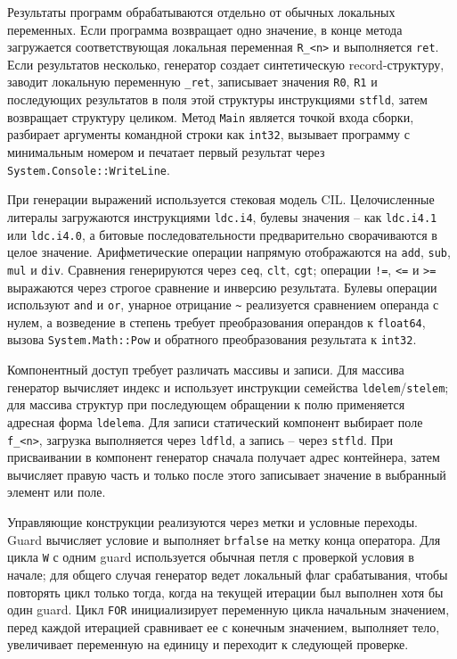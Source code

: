 Результаты программ обрабатываются отдельно от обычных локальных переменных.
Если программа возвращает одно значение, в конце метода загружается соответствующая локальная переменная \texttt{R\_<n>} и выполняется \texttt{ret}.
Если результатов несколько, генератор создает синтетическую record-структуру, заводит локальную переменную \texttt{\_ret}, записывает значения \texttt{R0}, \texttt{R1} и последующих результатов в поля этой структуры инструкциями \texttt{stfld}, затем возвращает структуру целиком.
Метод \texttt{Main} является точкой входа сборки, разбирает аргументы командной строки как \texttt{int32}, вызывает программу с минимальным номером и печатает первый результат через \texttt{System.Console::WriteLine}.

При генерации выражений используется стековая модель CIL.
Целочисленные литералы загружаются инструкциями \texttt{ldc.i4}, булевы значения -- как \texttt{ldc.i4.1} или \texttt{ldc.i4.0}, а битовые последовательности предварительно сворачиваются в целое значение.
Арифметические операции напрямую отображаются на \texttt{add}, \texttt{sub}, \texttt{mul} и \texttt{div}.
Сравнения генерируются через \texttt{ceq}, \texttt{clt}, \texttt{cgt}; операции \texttt{!=}, \texttt{<=} и \texttt{>=} выражаются через строгое сравнение и инверсию результата.
Булевы операции используют \texttt{and} и \texttt{or}, унарное отрицание \texttt{\textasciitilde} реализуется сравнением операнда с нулем, а возведение в степень требует преобразования операндов к \texttt{float64}, вызова \texttt{System.Math::Pow} и обратного преобразования результата к \texttt{int32}.

Компонентный доступ требует различать массивы и записи.
Для массива генератор вычисляет индекс и использует инструкции семейства \texttt{ldelem}/\texttt{stelem}; для массива структур при последующем обращении к полю применяется адресная форма \texttt{ldelema}.
Для записи статический компонент выбирает поле \texttt{f\_<n>}, загрузка выполняется через \texttt{ldfld}, а запись -- через \texttt{stfld}.
При присваивании в компонент генератор сначала получает адрес контейнера, затем вычисляет правую часть и только после этого записывает значение в выбранный элемент или поле.

Управляющие конструкции реализуются через метки и условные переходы.
Guard вычисляет условие и выполняет \texttt{brfalse} на метку конца оператора.
Для цикла \texttt{W} с одним guard используется обычная петля с проверкой условия в начале; для общего случая генератор ведет локальный флаг срабатывания, чтобы повторять цикл только тогда, когда на текущей итерации был выполнен хотя бы один guard.
Цикл \texttt{FOR} инициализирует переменную цикла начальным значением, перед каждой итерацией сравнивает ее с конечным значением, выполняет тело, увеличивает переменную на единицу и переходит к следующей проверке.

